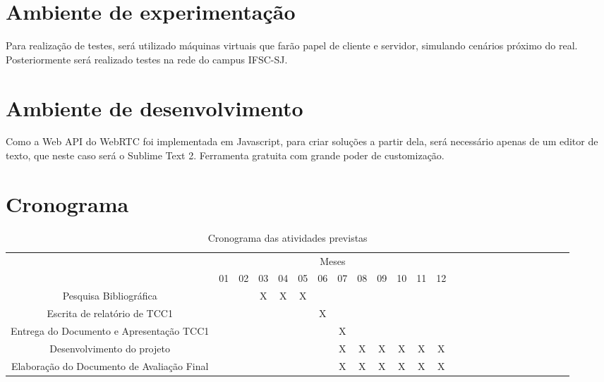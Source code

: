 \documentclass[12pt,a4paper,oneside]{report}
\begin{document}
\section{Ambiente de experimentação}
\label{s_ambienteDeExperimentacao} %

Para realização de testes, será utilizado máquinas virtuais que farão papel de cliente e servidor, simulando cenários próximo do real. Posteriormente será realizado testes na rede do campus IFSC-SJ.

\section{Ambiente de desenvolvimento}
\label{s_ambienteDeDesenvolvimento} %

Como a Web API do WebRTC foi implementada em Javascript, para criar soluções a partir dela, será necessário apenas de um editor de texto, que neste caso será o Sublime Text 2. Ferramenta gratuita com grande poder de customização.

\section{Cronograma}
\label{s_cronograma} %

\begin{table}[!htpb]
\centering

\begin{small} 
  
\setlength{\tabcolsep}{3pt} 


\begin{tabular}{|c|c|c|c|c|c|c|c|c|c|c|c|c|c|c|c|c|c|c|c|c|c|c|c|c|}\hline
 & \multicolumn{12}{c|}{Meses}\\ \cline{1-13}
\raisebox{1.5ex}{Etapa} & 01 & 02 & 03 & 04 & 05 & 06 & 07 & 08 & 09 & 10 & 11 & 12 \\ \hline

Pesquisa Bibliográfica &  &  & X & X & X &  &  &  &  &  &  & \\ \hline
Escrita de relatório de TCC1 &  &  &  &  &  & X &  &  &  &  &  & \\ \hline
Entrega do Documento e Apresentação TCC1 &  &  &  &  &  &  & X &  &  &  &  & \\ \hline
Desenvolvimento do projeto &  &  &  &  &  &  & X & X & X & X & X & X \\ \hline
Elaboração do Documento de Avaliação Final &  &  &  &  &  &  & X & X & X & X & X & X  \\ \hline

\end{tabular} 
\end{small}
\caption{Cronograma das atividades previstas}
\label{t_cronograma}
\end{table}
\end{document}
